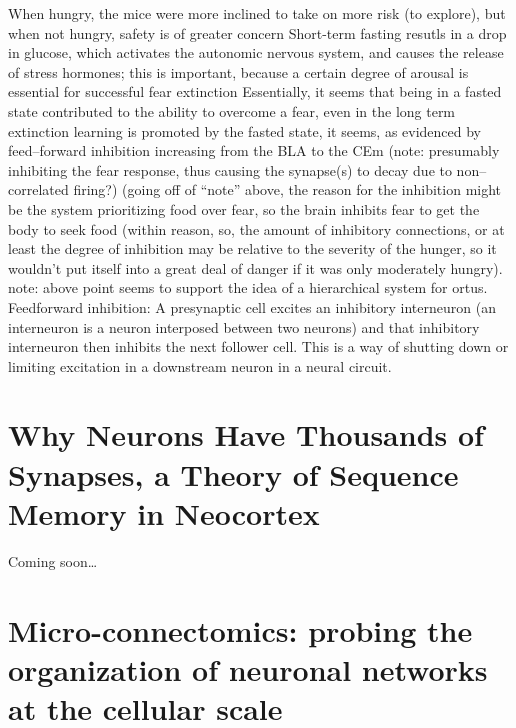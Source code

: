 \documentclass[11pt, a4paper, oneside]{article}   	%
\begin{document}
\begin{outline}
        \subpoint When hungry, the mice were more inclined to take on more risk (to explore), but when not hungry, safety is of greater concern
        \subpoint Short-term fasting resutls in a drop in glucose, which activates the autonomic nervous system, and causes the release of stress hormones; this is important, because a certain degree of arousal is essential for successful fear extinction
           \subsubpoint Essentially, it seems that being in a fasted state contributed to the ability to overcome a fear, even in the long term
           \subsubpoint extinction learning is promoted by the fasted state, it seems, as evidenced by feed--forward inhibition increasing from the BLA to the CEm (note: presumably inhibiting the fear response, thus causing the synapse(s) to decay due to non--correlated firing?)
                \supersubpoint (going off of ``note'' above, the reason for the inhibition might be the system prioritizing food over fear, so the brain inhibits fear to get the body to seek food (within reason, so, the amount of inhibitory connections, or at least the degree of inhibition may be relative to the severity of the hunger, so it wouldn't put itself into a great deal of danger if it was only moderately hungry).
                \supersubpoint note: above point seems to support the idea of a hierarchical system for ortus.
        \subpoint Feedforward inhibition:  A presynaptic cell excites an inhibitory interneuron (an interneuron is a neuron interposed between two neurons) and that inhibitory interneuron then inhibits the next follower cell.  This is a way of shutting down or limiting excitation in a downstream neuron in a neural circuit.


\end{outline}

\section{Why Neurons Have Thousands of Synapses, a Theory of Sequence Memory in Neocortex \cite{Hawkins2016}}

Coming soon\ldots

\section{Micro-connectomics: probing the organization of neuronal networks at the cellular scale \cite{Schroter2017}}
\end{document}
